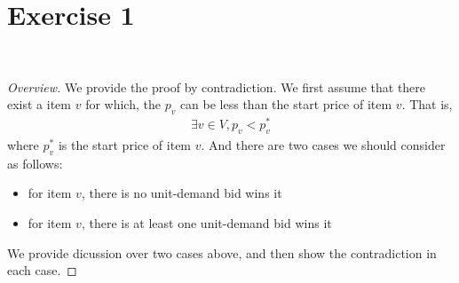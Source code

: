 \documentclass[11pt,a4paper]{article}
\begin{document}
\begin{titlepage}
    \maketitle
\end{titlepage}
\renewcommand{\contentsname}{Contents}
\begin{center} 
    \tableofcontents 
\end{center}
\newpage
\newcommand{\wm}[1]{\ensuremath{w(M_{#1})}}
\newcommand{\wmp}[1]{\ensuremath{w(M'_{#1})}}
\newcommand{\wmi}{\ensuremath{w(M_i)}}
\newcommand{\wmip}{\ensuremath{w(M'_i)}}
\newcommand{\constantTime}{\ensuremath{\mathcal{O}(1)}}
\newcommand{\linearTime}{\ensuremath{\mathcal{O}(n)}}
\newcommand{\lbw}[1]{\ensuremath{a_{#1} q_{#1} + b_{#1}}}  %
\newcommand{\sbw}[1]{\ensuremath{m_{#1}}}
\section{Exercise 1}
 \\[0.5cm]

\begin{proof} [Overview]
We provide the proof by contradiction. We first assume that there exist a item $v$
for which, the $p_v$ can be less than the start price of item $v$. That is,
\begin{align} \label{tocontra}
    \exists v \in V,  p_v < p^*_v 
\end{align}
where $p^*_v$ is the start price of item
$v$. And there are two cases we should consider as follows:
\begin{itemize}
    \item{for item $v$, there is no unit-demand bid wins it}
    \item{for item $v$, there is at least one unit-demand bid wins it}
\end{itemize}
We provide dicussion over two cases above, and then show the contradiction in
each case.
\end{proof}
\end{document}
